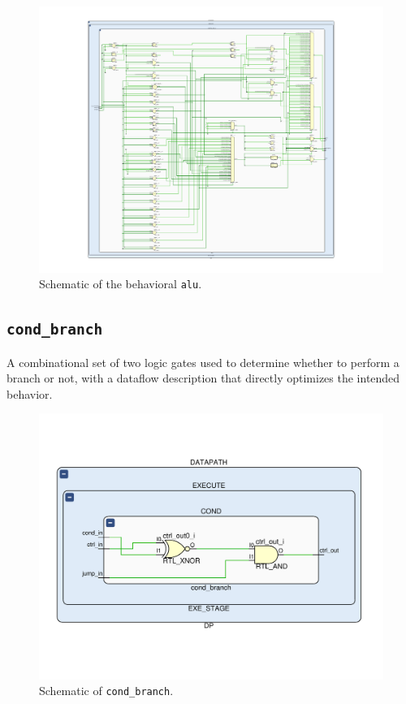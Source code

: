 \begin{figure}[!ht]
\centering
\includegraphics[width=\textwidth]{./chapters/figures/alu.pdf} 
\caption{Schematic of the behavioral \texttt{alu}.}
\end{figure}

\subsection{\texttt{cond\_branch}}
\label{cond-branch}
A combinational set of two logic gates used to determine whether to perform a branch or not, with a dataflow description that directly optimizes the intended behavior.

\begin{figure}[!ht]
\centering
\includegraphics[width=\textwidth]{./chapters/figures/cond_branch.pdf} 
\caption{Schematic of \texttt{cond\_branch}.}
\end{figure}

